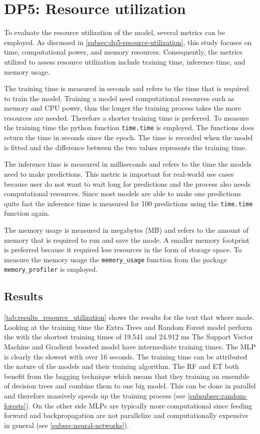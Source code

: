 \section{DP5: Resource utilization}\label{sec:resource-utilization}

To evaluate the resource utilization of the model, several metrics can be employed.
As discussed in \cref{subsec:dp5-resource-utilization}, this study focuses on time, computational power,
and memory resources.
Consequently, the metrics utilized to assess resource utilization include training time, inference time, and memory
usage.

The training time is measured in seconds and refers to the time that is required to train the model.
Training a model need computational resources such as memory and CPU power, thus the longer the training process
takes the more resources are needed.
Therefore a shorter training time is preferred.
To measure the training time the python function \texttt{time.time} is employed.
The functions does return the time in seconds since the epoch.
The time is recorded when the model is fitted and the difference between the two values
represents the training time.

The inference time is measured in milliseconds and refers to the time the models need to make predictions.
This metric is important for real-world use cases because user do not want to wait long for predictions and the
process also needs computational resources.
Since most models are able to make one predictions quite fast the inference time is measured for 100 predictions
using the \texttt{time.time} function again.

The memory usage is measured in megabytes (MB) and refers to the amount of memory that is required to run and save
the mode.
A smaller memory footprint is preferred because it required less resources in the form of storage space.
To measure the memory usage the \texttt{memory\_usage} function from the package \texttt{memory\_profiler} is
employed.


\subsection*{Results}

\cref{tab:results_resource_utilization} shows the results for the text that where made.
Looking at the training time the Extra Trees and Random Forest model perform the with the shortest training times
of 19.541 and 24.912 ms
The Support Vector Machine and Gradient boosted model have intermediate training times.
The MLP is clearly the slowest with over 16 seconds.
The training time can be attributed the nature of the models and their training algorithm.
The RF and ET both benefit from the bagging technique which means that they training an ensemble of decision trees and
combine them to one big model.
This can be done in parallel and therefore massively speeds up the training
process (see \ref{subsubsec:random-forests}).
On the other side MLPs are typically more computational since feeding forward and backpropagation are not
parallelize and computationally expensive in general (see \cref{subsec:neural-networks}).


